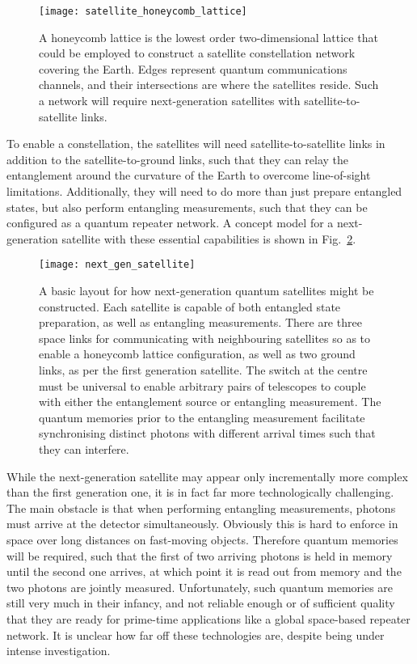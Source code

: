 \begin{figure}[!htbp]
\texttt{[image: satellite\_honeycomb\_lattice]}
\captionspace \caption{A honeycomb lattice is the lowest order two-dimensional lattice that could be employed to construct a satellite constellation network covering the Earth. Edges represent quantum communications channels, and their intersections are where the satellites reside. Such a network will require next-generation satellites with satellite-to-satellite links.}\label{fig:sat_honeycomb}	
\end{figure}

To enable a constellation, the satellites will need satellite-to-satellite links in addition to the satellite-to-ground links, such that they can relay the entanglement around the curvature of the Earth to overcome line-of-sight limitations. Additionally, they will need to do more than just prepare entangled states, but also perform entangling measurements, such that they can be configured as a quantum repeater network. A concept model for a next-generation satellite with these essential capabilities is shown in Fig.~\ref{fig:next_gen_sat}.

\begin{figure}[!htbp]
\texttt{[image: next\_gen\_satellite]}
\captionspace \caption{A basic layout for how next-generation quantum satellites might be constructed. Each satellite is capable of both entangled state preparation, as well as entangling measurements. There are three space links for communicating with neighbouring satellites so as to enable a honeycomb lattice configuration, as well as two ground links, as per the first generation satellite. The switch at the centre must be universal to enable arbitrary pairs of telescopes to couple with either the entanglement source or entangling measurement. The quantum memories prior to the entangling measurement facilitate synchronising distinct photons with different arrival times such that they can interfere.}\label{fig:next_gen_sat}	
\end{figure}

While the next-generation satellite may appear only incrementally more complex than the first generation one, it is in fact far more technologically challenging. The main obstacle is that when performing entangling measurements, photons must arrive at the detector simultaneously. Obviously this is hard to enforce in space over long distances on fast-moving objects. Therefore quantum memories will be required, such that the first of two arriving photons is held in memory until the second one arrives, at which point it is read out from memory and the two photons are jointly measured. Unfortunately, such quantum memories are still very much in their infancy, and not reliable enough or of sufficient quality that they are ready for prime-time applications like a global space-based repeater network. It is unclear how far off these technologies are, despite being under intense investigation.

